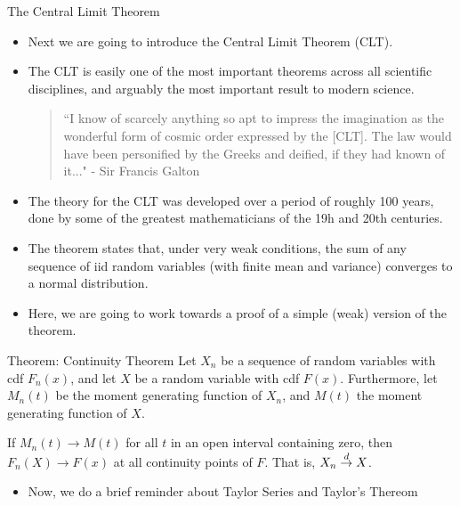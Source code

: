 \begin{frame}[allowframebreaks]{The Central Limit Theorem}
  \begin{itemize}
    \item Next we are going to introduce the Central Limit Theorem (CLT).
    \item The CLT is easily one of the most important theorems across all scientific disciplines, and arguably the most important result to modern science.
    
    \vspace{2mm}
    
    \begin{quote}
      ``I know of scarcely anything so apt to impress the imagination as the wonderful form of cosmic order expressed by the [CLT]. The law would have been personified by the Greeks and deified, if they had known of it..." - Sir Francis Galton
    \end{quote}
    
    \item The theory for the CLT was developed over a period of roughly 100 years, done by some of the greatest mathematicians of the 19h and 20th centuries.
    \item The theorem states that, under very weak conditions, the sum of any sequence of iid random variables (with finite mean and variance) converges to a normal distribution.
    \item Here, we are going to work towards a proof of a simple (weak) version of the theorem. 
    
  \end{itemize}
  
  \begin{block}{Theorem: Continuity Theorem}
    Let $X_n$ be a sequence of random variables with cdf $F_n(x)$, and let $X$ be a random variable with cdf $F(x)$.
    Furthermore, let $M_n(t)$ be the moment generating function of $X_n$, and $M(t)$ the moment generating function of $X$. 
    
    If $M_n(t) \rightarrow M(t)$ for all $t$ in an open interval containing zero, then $F_n(X) \rightarrow F(x)$ at all continuity points of $F$. That is, $X_n \overset{d}{\rightarrow} X$.
  \end{block}
  
  \begin{itemize}
    \item Now, we do a brief reminder about Taylor Series and Taylor's Thereom
  \end{itemize}
  

\end{frame}
